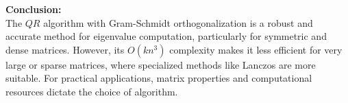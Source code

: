 \documentclass[journal,12pt,onecolumn]{IEEEtran}
\theoremstyle{remark}
\begin{document}
\textbf{Conclusion:} \\
The $QR$ algorithm with Gram-Schmidt orthogonalization is a robust and accurate method for eigenvalue computation, particularly for symmetric and dense matrices. However, its $O(kn^3)$ complexity makes it less efficient for very large or sparse matrices, where specialized methods like Lanczos are more suitable. For practical applications, matrix properties and computational resources dictate the choice of algorithm.
\end{document}
